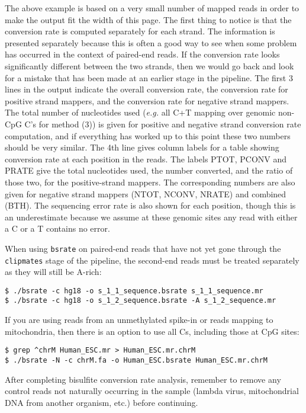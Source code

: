 \documentclass[10pt]{article}
\newcommand{\prog}[1]{\texttt{#1}}
\begin{document}
\noindent
The above example is based on a very small number of mapped reads in
order to make the output fit the width of this page.  The first thing
to notice is that the conversion rate is computed separately for each
strand. The information is presented separately because this is often
a good way to see when some problem has occurred in the context of
paired-end reads. If the conversion rate looks significantly different
between the two strands, then we would go back and look for a mistake
that has been made at an earlier stage in the pipeline. The first 3
lines in the output indicate the overall conversion rate, the
conversion rate for positive strand mappers, and the conversion rate
for negative strand mappers. The total number of nucleotides used
({\em e.g.} all C+T mapping over genomic non-CpG C's for method (3)) is
given for positive and negative strand conversion rate computation,
and if everything has worked up to this point these two numbers should
be very similar. The 4th line gives column labels for a table showing
conversion rate at each position in the reads.  The labels PTOT, PCONV
and PRATE give the total nucleotides used, the number converted, and
the ratio of those two, for the positive-strand mappers. The
corresponding numbers are also given for negative strand mappers
(NTOT, NCONV, NRATE) and combined (BTH). The sequencing error rate is
also shown for each position, though this is an underestimate because
we assume at these genomic sites any read with either a C or a T
contains no error.

When using \prog{bsrate} on paired-end reads that have not yet gone
through the \prog{clipmates} stage of the pipeline, the second-end
reads must be treated separately as they will still be A-rich:
\begin{verbatim}
$ ./bsrate -c hg18 -o s_1_1_sequence.bsrate s_1_1_sequence.mr
$ ./bsrate -c hg18 -o s_1_2_sequence.bsrate -A s_1_2_sequence.mr
\end{verbatim}
If you are using reads from an unmethylated spike-in or reads mapping
to mitochondria, then there is an option to use all Cs, including those
at CpG sites:
\begin{verbatim}
$ grep ^chrM Human_ESC.mr > Human_ESC.mr.chrM
$ ./bsrate -N -c chrM.fa -o Human_ESC.bsrate Human_ESC.mr.chrM
\end{verbatim}

After completing bisulfite conversion rate analysis, remember to
remove any control reads not naturally occurring in the sample
(lambda virus, mitochondrial DNA from another organism, etc.)
before continuing.
\end{document}
